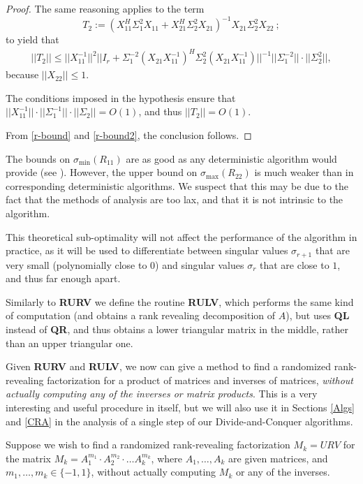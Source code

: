 \documentclass{article}
\theoremstyle{definition}
\begin{document}
\begin{proof}
The same reasoning applies to the term
\[
T_2:= \left (X_{11}^{H} \Sigma_1^2 X_{11} + X_{21}^H \Sigma^2_2 X_{21} \right )^{-1} X_{21} \Sigma_2^2 X_{22}~;
\]
to yield that 
\begin{eqnarray} \label{r-bound2}
||T_2|| \leq ||X_{11}^{-1}||^2 ||I_r + \Sigma_1^{-2} (X_{21} X_{11}^{-1})^{H} \Sigma_2^2 (X_{21} X_{11}^{-1}) ||^{-1} 
||\Sigma_1^{-2} || \cdot || \Sigma_2^{2}|| ,
\end{eqnarray}
because $||X_{22}|| \leq 1$.

The conditions imposed in the hypothesis ensure that 
$||X_{11}^{-1}|| \cdot  ||\Sigma_1^{-1}|| \cdot ||\Sigma_2|| = O(1)$, and thus $||T_2|| = O(1)$.

From \eqref{r-bound} and \eqref{r-bound2}, the conclusion follows. 
\end{proof}

\vspace{.25cm}

The bounds on $\sigma_{\min} (R_{11})$ are as good as any deterministic algorithm would provide (see \cite{GE96}). However, the upper bound on $\sigma_{\max} (R_{22})$ is much weaker than in corresponding deterministic algorithms. We suspect that this may be due to the fact that the methods of analysis are too lax, and that it is not intrinsic to the algorithm. 

This theoretical sub-optimality will not affect the performance of the algorithm in practice, as it will be used to differentiate between singular values $\sigma_{r+1}$ that are very small (polynomially close to $0$) and singular values $\sigma_r$ that are close to $1$, and thus far enough apart. 

Similarly to \textbf{RURV} we define the routine \textbf{RULV}, which performs the same kind of computation (and obtains a rank revealing decomposition of $A$), but uses \textbf{QL} instead of \textbf{QR}, and thus obtains a lower triangular matrix in the middle, rather than an upper triangular one. 

Given \textbf{RURV} and \textbf{RULV}, we now can give a method to find a randomized rank-revealing factorization for a product of matrices and inverses of matrices, \emph{without actually computing any of the inverses or matrix products}. This is a very interesting and useful procedure in itself, but we will also use it in Sections \ref{Algs} and \ref{CRA} in the analysis of a single step of our Divide-and-Conquer algorithms. 

Suppose we wish to find a randomized rank-revealing factorization $M_k = URV$ for the matrix $M_k = A_1^{m_1} \cdot A_2^{m_2} \cdot \ldots A_k^{m_k}$, where $A_1, \ldots, A_k$ are given matrices, and $m_1, \ldots, m_k \in \{-1,1\}$, without actually computing $M_k$ or any of the inverses. 
\end{document}
